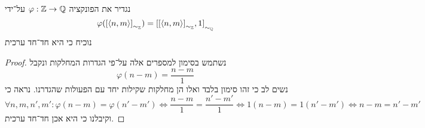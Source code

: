 \Subquestion{}
נגדיר את הפונקציה $\varphi : \mathbb{Z} \to \mathbb{Q}$ על־ידי
\[
	\varphi({[\langle n, m \rangle]}_{\sim_{\mathbb{Z}}}) = {[{[\langle n, m \rangle]}_{\sim_{\mathbb{Z}}}, 1]}_{\sim_{\mathbb{Q}}}
\]
נוכיח כי היא חד־חד ערכית
\begin{proof}
	נשתמש בסימון למספרים אלה על־פי הגדרות המחלקות ונקבל
	\[
		\varphi(n - m) = \frac{n - m}{1}
	\]
	נשים לב כי זהו סימון בלבד ואלו הן מחלקות שקילות יחד עם הפעולות שהגדרנו.
	נראה כי
	\[
		\forall n, m, n', m' : \varphi(n - m) = \varphi(n' - m') \iff \frac{n - m}{1} = \frac{n' - m'}{1} \iff 1(n - m) = 1(n' - m') \iff n - m = n' - m'
	\]
	וקיבלנו כי היא אכן חד־חד ערכית.
\end{proof}


